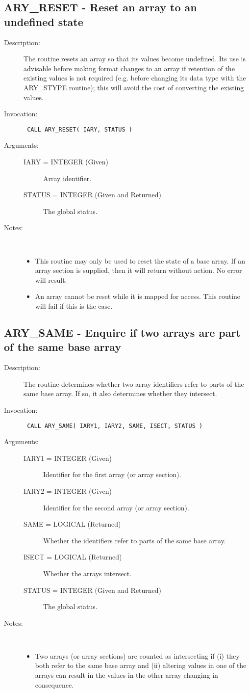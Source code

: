 \documentclass[twoside,11pt]{article}
\newcommand{\xlabel}[1]{}
\newlength{\sstbannerlength}
\newlength{\sstcaptionlength}
\newlength{\sstexampleslength}
\newlength{\sstexampleswidth}
\newcommand{\sstroutine}[3]{
   \goodbreak
   \rule{\textwidth}{0.5mm}
   \vspace{-7ex}
   \newline
   \settowidth{\sstbannerlength}{{\Large {\bf #1}}}
   \setlength{\sstcaptionlength}{\textwidth}
   \setlength{\sstexampleslength}{\textwidth}
   \addtolength{\sstbannerlength}{0.5em}
   \addtolength{\sstcaptionlength}{-2.0\sstbannerlength}
   \addtolength{\sstcaptionlength}{-5.0pt}
   \settowidth{\sstexampleswidth}{{\bf Examples:}}
   \addtolength{\sstexampleslength}{-\sstexampleswidth}
   \parbox[t]{\sstbannerlength}{\flushleft{\Large {\bf #1}}}
   \parbox[t]{\sstcaptionlength}{\center{\Large #2}}
   \parbox[t]{\sstbannerlength}{\flushright{\Large {\bf #1}}}
   \begin{description}
      #3
   \end{description}
}
\newcommand{\sstdescription}[1]{\item[Description:] #1}
\newcommand{\sstinvocation}[1]{\item[Invocation:]\hspace{0.4em}{\tt #1}}
\newcommand{\sstarguments}[1]{
   \item[Arguments:] \mbox{} \\
   \vspace{-3.5ex}
   \begin{description}
      #1
   \end{description}
}
\newcommand{\sstsubsection}[1]{ \item[{#1}] \mbox{} \\}
\newcommand{\sstnotes}[1]{\item[Notes:] \mbox{} \\[1.3ex] #1}
\newcommand{\sstitemlist}[1]{
  \mbox{} \\
  \vspace{-3.5ex}
  \begin{itemize}
     #1
  \end{itemize}
}
\newcommand{\sstitem}{\item}
\newcommand{\ssttt}{\tt}
\renewcommand{\sstroutine}[3]{
      \subsection{#1\xlabel{#1}-\label{#1}#2}
      \begin{description}
         #3
      \end{description}
   }
\renewcommand{\sstdescription}[1]{\item[Description:]
      \begin{description}
         #1
      \end{description}
   }
\renewcommand{\sstinvocation}[1]{\item[Invocation:]
      \begin{description}
         {\ssttt #1}
      \end{description}
   }
\renewcommand{\sstarguments}[1]{
      \item[Arguments:]
      \begin{description}
         #1
      \end{description}
   }
\renewcommand{\sstsubsection}[1]{\item[{#1}]}
\renewcommand{\sstnotes}[1]{\item[Notes:]
      \begin{description}
         #1
      \end{description}
   }
\newcommand{\sstitemlist}[1]{
      \begin{itemize}
         #1
      \end{itemize}
   }
\begin{document}
\sstroutine{
   ARY\_RESET
}{
   Reset an array to an undefined state
}{
   \sstdescription{
      The routine resets an array so that its values become undefined.
      Its use is advisable before making format changes to an array if
      retention of the existing values is not required (e.g. before
      changing its data type with the ARY\_STYPE routine); this will
      avoid the cost of converting the existing values.
   }
   \sstinvocation{
      CALL ARY\_RESET( IARY, STATUS )
   }
   \sstarguments{
      \sstsubsection{
         IARY = INTEGER (Given)
      }{
         Array identifier.
      }
      \sstsubsection{
         STATUS = INTEGER (Given and Returned)
      }{
         The global status.
      }
   }
   \sstnotes{
      \sstitemlist{

         \sstitem
         This routine may only be used to reset the state of a base
         array. If an array section is supplied, then it will return
         without action. No error will result.

         \sstitem
         An array cannot be reset while it is mapped for access. This
         routine will fail if this is the case.
      }
   }
}
\sstroutine{
   ARY\_SAME
}{
   Enquire if two arrays are part of the same base array
}{
   \sstdescription{
      The routine determines whether two array identifiers refer to
      parts of the same base array.  If so, it also determines whether
      they intersect.
   }
   \sstinvocation{
      CALL ARY\_SAME( IARY1, IARY2, SAME, ISECT, STATUS )
   }
   \sstarguments{
      \sstsubsection{
         IARY1 = INTEGER (Given)
      }{
         Identifier for the first array (or array section).
      }
      \sstsubsection{
         IARY2 = INTEGER (Given)
      }{
         Identifier for the second array (or array section).
      }
      \sstsubsection{
         SAME = LOGICAL (Returned)
      }{
         Whether the identifiers refer to parts of the same base array.
      }
      \sstsubsection{
         ISECT = LOGICAL (Returned)
      }{
         Whether the arrays intersect.
      }
      \sstsubsection{
         STATUS = INTEGER (Given and Returned)
      }{
         The global status.
      }
   }
   \sstnotes{
      \sstitemlist{

         \sstitem
         Two arrays (or array sections) are counted as intersecting if
         (i) they both refer to the same base array and (ii) altering
         values in one of the arrays can result in the values in the other
         array changing in consequence.
      }
   }
}
\end{document}
